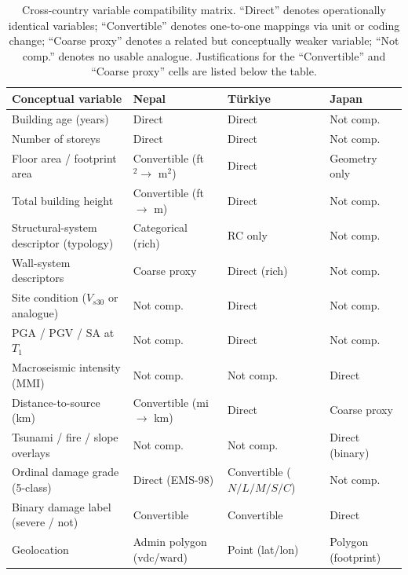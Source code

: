 \documentclass[11pt,a4paper]{article}
\begin{document}
\begin{table}[!t]
\centering
\caption{Cross-country variable compatibility matrix. ``Direct''
denotes operationally identical variables; ``Convertible''
denotes one-to-one mappings via unit or coding change;
``Coarse proxy'' denotes a related but conceptually weaker
variable; ``Not comp.'' denotes no usable analogue.
Justifications for the ``Convertible'' and ``Coarse proxy'' cells
are listed below the table.}
\label{tab:compat-matrix}
\small
\begin{tabularx}{\linewidth}{X l l l}
\toprule
\textbf{Conceptual variable} & \textbf{Nepal} & \textbf{T\"urkiye} & \textbf{Japan} \\
\midrule
Building age (years)                & Direct        & Direct       & Not comp. \\
Number of storeys                   & Direct        & Direct       & Not comp. \\
Floor area / footprint area         & Convertible (ft$^2 \to$ m$^2$) & Direct & Geometry only \\
Total building height               & Convertible (ft $\to$ m) & Direct & Not comp. \\
Structural-system descriptor (typology) & Categorical (rich) & RC only & Not comp. \\
Wall-system descriptors             & Coarse proxy & Direct (rich) & Not comp. \\
Site condition ($V_{s30}$ or analogue) & Not comp. & Direct & Not comp. \\
PGA / PGV / SA at $T_1$             & Not comp. & Direct & Not comp. \\
Macroseismic intensity (MMI)        & Not comp. & Not comp. & Direct \\
Distance-to-source (km)             & Convertible (mi $\to$ km) & Direct & Coarse proxy \\
Tsunami / fire / slope overlays     & Not comp. & Not comp. & Direct (binary) \\
Ordinal damage grade (5-class)      & Direct (EMS-98) & Convertible ($N/L/M/S/C$) & Not comp. \\
Binary damage label (severe / not)  & Convertible & Convertible & Direct \\
Geolocation                         & Admin polygon (vdc/ward) & Point (lat/lon) & Polygon (footprint) \\
\bottomrule
\end{tabularx}
\end{table}
\end{document}
